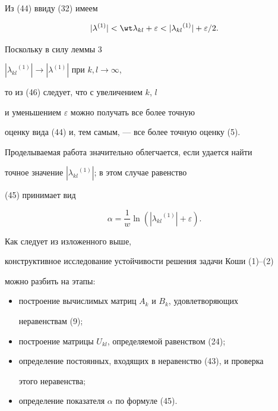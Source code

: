 \begin{note}


Из (44) ввиду (32) имеем


\begin{equation}


|\lambda^{(1)}|<\wt\lambda_{kl}+{\varepsilon}<|{\lambda_{kl}}^{(1)}|+


\varepsilon/2.


\end{equation}


Поскольку в силу леммы 3\;


$|{\lambda_{kl}}^{(1)}|\to|\lambda^{(1)}|$ при $k,l\to\infty$,


то из (46) следует, что с увеличением $k$, $l$


и уменьшением ${\varepsilon}$ можно получать все более точную


оценку вида (44) и, тем самым, --- все более точную оценку (5).


\end{note}





\begin{note}


Проделываемая работа значительно облегчается, если удается найти


точное значение $|{\lambda_{kl}}^{(1)}|$; в этом случае равенство


(45) принимает вид


$$


\alpha = \frac{1}{w} \ln ( | {\lambda_{kl}}^{(1)}|+{\varepsilon}).


$$


\end{note}





Как следует из изложенного выше,


конструктивное исследование устойчивости решения задачи Коши (1)--(2)


можно разбить на этапы:


\begin{itemize}


\item[1)] построение вычислимых матриц $A_k$  и $B_k$, удовлетворяющих


неравенствам (9);


\item[2)] построение матрицы $U_{kl}$, определяемой равенством (24);


\item[3)] определение постоянных, входящих в неравенство (43), и проверка


этого неравенства;


\item[4)] определение показателя $\alpha$ по формуле (45).


\end{itemize}





